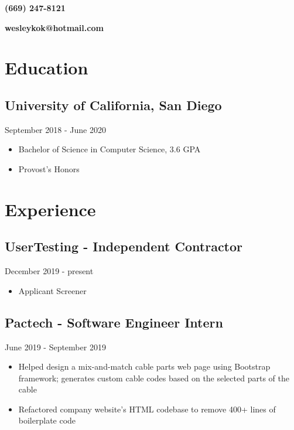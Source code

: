 \documentclass{article}
\makeatletter
\renewcommand{\maketitle}
{
{\noindent\fontsize{40pt}{0pt}\selectfont\bf\color{DarkMidnightBlue} \theauthor} 

{\vspace{-1em}\hfill\large\bf (669) 247-8121}

{\noindent\Huge \href{https://github.com/WKhiro}{\faGithub} \href{https://www.linkedin.com/in/wesley-kok/}{\color{Aquamarine}\faLinkedin}}

{\vspace{-1.5em}\hfill\large\bf wesleykok@hotmail.com}

}
\makeatother
\begin{document}
\author{Wesley Kok}
\maketitle 		%
\thispagestyle{empty} 	%
\large 			%

\section{Education}

\vspace{-0.5em}
\subsection{University of California, San Diego}\hfill {\color{Carmine}September 2018 - June 2020}
\begin{itemize}
	\item Bachelor of Science in Computer Science, 3.6 GPA
	\item Provost's Honors
\end{itemize}

\vspace{-1.5em}
\section{Experience}

\vspace{-0.5em}
\subsection{UserTesting - Independent Contractor}\hfill {\color{Carmine}December 2019 - present}
\begin{itemize}
	\item Applicant Screener
\end{itemize}

\vspace{-1em} 
\subsection{Pactech - Software Engineer Intern}\hfill {\color{Carmine}June 2019 - September 2019}
\begin{itemize}
	\item Helped design a mix-and-match cable parts web page using Bootstrap framework; generates custom cable codes based on the selected parts of the cable
	\item Refactored company website's HTML codebase to remove 400+ lines of boilerplate code
\end{itemize}
\vspace{1.5em}
\end{document}
